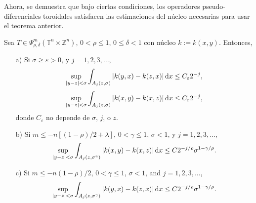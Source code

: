 Ahora, se demuestra que bajo ciertas condiciones, los operadores pseudo-diferenciales toroidales satisfacen las estimaciones del núcleo necesarias para usar el teorema anterior. 
\begin{theorem}
	Sea $T\in \Psi^m_{\rho,\delta}(\mathbb{T}^n\times\mathbb{Z}^n)$, $0<\rho\leq1$, $0\leq\delta<1$ con núcleo $k:=k(x, y)$. Entonces, 
	\begin{itemize}
		\item[a)] Si $\sigma \geq \varepsilon>0$, y $j=1,2,3,...$,
		\begin{equation}
			\sup_{|y-z|<\sigma}\int_{A_j(z, \sigma)} |k(y, x) - k(z, x)|\mathop{}\!\mathrm{d} x \leq C_\varepsilon2^{-j},
		\end{equation}
		\begin{equation}
			\sup_{|y-z|<\sigma}\int_{A_j(z, \sigma)} |k(x, y) - k(x, z)|\mathop{}\!\mathrm{d} x \leq C_\varepsilon2^{-j},
		\end{equation}
		donde $C_\varepsilon$ no depende de $\sigma$, $j$, o $z$.
		\item[b)] Si $m\leq -n[(1-\rho)/2 +\lambda]$, $0<\gamma\leq1$, $\sigma<1$, y $j=1,2,3,...$, 
		\begin{equation}
			\sup_{|y-z|<\sigma}\int_{A_j(z, \sigma^\gamma)} |k(x, y) - k(x, z)|\mathop{}\!\mathrm{d} x \leq C2^{-j/\rho}\sigma^{1-\gamma/\rho}.
		\end{equation}
		
		\item[c)] Si $m\leq -n(1-\rho)/2 $, $0<\gamma\leq1$, $\sigma<1$, and $j=1,2,3,...$, 
		\begin{equation}
			\sup_{|y-z|<\sigma}\int_{A_j(z, \sigma^\gamma)} |k(y, x) - k(z, x)|\mathop{}\!\mathrm{d} x \leq C2^{-j/\rho}\sigma^{1-\gamma/\rho}.
			\label{eq:kernel-estimate-c}
		\end{equation}
		
	\end{itemize}
	\label{theo:pdo-kernel}
\end{theorem}
